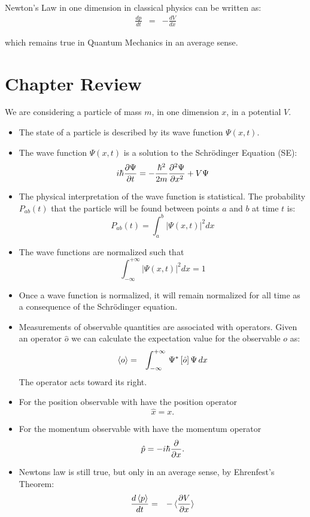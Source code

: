 \documentclass[12pt]{book}
\begin{document}
Newton's Law in one dimension in classical physics can be written as:
\begin{eqnarray}
\label{eqn:ehrenfest}
\frac{dp}{dt} &=& -\frac{dV}{dx}
\end{eqnarray}

which remains true in Quantum Mechanics in an average sense.

\section{Chapter Review}

We are considering a particle of mass $m$, in one dimension $x$, in a potential $V$.

\begin{itemize}
\item The state of a particle is described by its wave function $\Psi(x,t)$.
\item The wave function $\Psi(x,t)$ is a solution to the Schr\"odinger Equation (SE):
\begin{equation}
\label{eqn:se}
i \hbar  \frac{\partial \Psi}{\partial t}  = - \frac{\hbar^2}{2 m} \frac{\partial^2 \Psi}{\partial x^2}  + V \Psi
\end{equation}
\item The physical interpretation of the wave function is statistical.  The probability $P_{ab}(t)$ that the particle will be found between points $a$ and $b$ at time $t$ is:
\begin{equation}
\label{eqn:prob}
P_{ab}(t) = \int_a^b |\Psi(x,t)|^2 dx
\end{equation}
\item The wave functions are normalized such that
\begin{equation}
\int_{-\infty}^{+\infty} |\Psi(x,t)|^2 dx = 1
\end{equation}
\item Once a wave function is normalized, it will remain normalized for all time as a consequence of the Schr\"odinger equation.
\item Measurements of observable quantities are associated with operators.  Given an operator $\hat{o}$ we can calculate the expectation value for the observable $o$ as:
\begin{eqnarray}
\braket{o}  &=& \int_{-\infty}^{+\infty} \, \Psi^* \left[ \hat{o} \right] \Psi \,dx 
\end{eqnarray}
The operator acts toward its right.
\item For the position observable with have the position operator 
\begin{equation}
\hat{x} = x.
\end{equation}
\item For the momentum observable with have the momentum operator 
\begin{equation}
\hat{p} = - i \hbar \frac{\partial}{\partial x}.
\end{equation}
\item Newtons law is still true, but only in an average sense, by Ehrenfest's Theorem:
\begin{eqnarray}
\frac{d \braket{p}}{dt} &=& - \braket{\frac{\partial V}{\partial x}}
\end{eqnarray}

\end{itemize}
\end{document}
